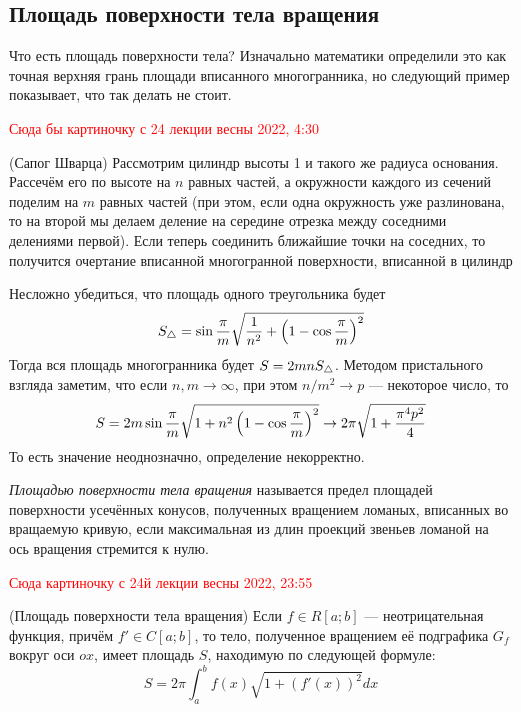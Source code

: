 \subsection{Площадь поверхности тела вращения}

\begin{note}
	Что есть площадь поверхности тела? Изначально математики определили это как точная верхняя грань площади вписанного многогранника, но следующий пример показывает, что так делать не стоит.
\end{note}

\textcolor{red}{Сюда бы картиночку с 24 лекции весны 2022, 4:30}

\begin{example} (Сапог Шварца)
	Рассмотрим цилиндр высоты 1 и такого же радиуса основания. Рассечём его по высоте на $n$ равных частей, а окружности каждого из сечений поделим на $m$ равных частей (при этом, если одна окружность уже разлинована, то на второй мы делаем деление на середине отрезка между соседними делениями первой). Если теперь соединить ближайшие точки на соседних, то получится очертание вписанной многогранной поверхности, вписанной в цилиндр
	
	Несложно убедиться, что площадь одного треугольника будет
	\[
		S_\triangle = \sin \frac{\pi}{m} \sqrt{\frac{1}{n^2} + \left(1 - \cos \frac{\pi}{m}\right)^2}
	\]
	Тогда вся площадь многогранника будет $S = 2mn S_\triangle$. Методом пристального взгляда заметим, что если $n, m \to \infty$, при этом $n / m^2 \to p$ --- некоторое число, то
	\[
		S = 2m\sin \frac{\pi}{m} \sqrt{1 + n^2\left(1 - \cos \frac{\pi}{m}\right)^2} \to 2\pi \sqrt{1 + \frac{\pi^4 p^2}{4}}
	\]
	То есть значение неоднозначно, определение некорректно.
\end{example}

\begin{definition}
	\textit{Площадью поверхности тела вращения} называется предел площадей поверхности усечённых конусов, полученных вращением ломаных, вписанных во вращаемую кривую, если максимальная из длин проекций звеньев ломаной на ось вращения стремится к нулю.
\end{definition}

\textcolor{red}{Сюда картиночку с 24й лекции весны 2022, 23:55}

\begin{theorem} (Площадь поверхности тела вращения)
	Если $f \in R[a; b]$ --- неотрицательная функция, причём $f' \in C[a; b]$, то тело, полученное вращением её подграфика $G_f$ вокруг оси $ox$, имеет площадь $S$, находимую по следующей формуле:
	\[
		S = 2\pi \int_a^b f(x) \sqrt{1 + (f'(x))^2}dx
	\]
\end{theorem}

